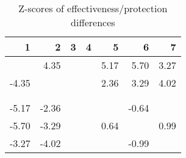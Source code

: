 \begin{table}[ht]
\centering
\begin{tabular}{rrrrrrr}
  \hline
1 & 2 & 3 & 4 & 5 & 6 & 7 \\ 
  \hline
 & 4.35 &  &  & 5.17 & 5.70 & 3.27 \\ 
  -4.35 &  &  &  & 2.36 & 3.29 & 4.02 \\ 
   &  &  &  &  &  &  \\ 
   &  &  &  &  &  &  \\ 
  -5.17 & -2.36 &  &  &  & -0.64 &  \\ 
  -5.70 & -3.29 &  &  & 0.64 &  & 0.99 \\ 
  -3.27 & -4.02 &  &  &  & -0.99 &  \\ 
   \hline
\end{tabular}
\caption{Z-scores of effectiveness/protection differences} 
\end{table}
